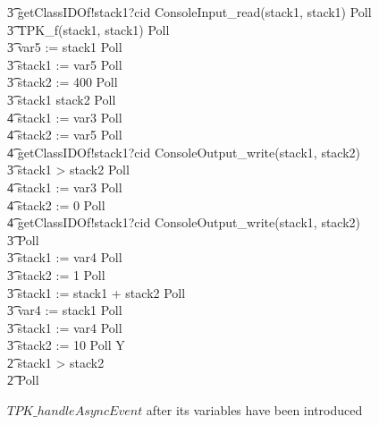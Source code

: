\begin{figure}[tp!]
\begin{circusaction}
    \t3 getClassIDOf!stack1?cid \then ConsoleInput\_read(stack1, stack1) \circseq Poll \circseq \\
    \t3 TPK\_f(stack1, stack1) \circseq Poll \circseq \\
    \t3 var5 := stack1 \circseq Poll \circseq \\
    \t3 stack1 := var5 \circseq Poll \circseq \\
    \t3 stack2 := 400 \circseq Poll \circseq \\
    \t3 \circif stack1 \leq stack2 \circthen Poll \circseq \\
    \t4 stack1 := var3 \circseq Poll \circseq \\
    \t4 stack2 := var5 \circseq Poll \circseq \\
    \t4 getClassIDOf!stack1?cid \then ConsoleOutput\_write(stack1, stack2) \\
    \t3 {} \circelse stack1 > stack2 \circthen Poll \circseq \\
    \t4 stack1 := var3 \circseq Poll \circseq \\
    \t4 stack2 := 0 \circseq Poll \circseq \\
    \t4 getClassIDOf!stack1?cid \then ConsoleOutput\_write(stack1, stack2) \\
    \t3 \circfi \circseq Poll \circseq \\
    \t3 stack1 := var4 \circseq Poll \circseq \\
    \t3 stack2 := 1 \circseq Poll \circseq \\
    \t3 stack1 := stack1 + stack2 \circseq Poll \circseq \\
    \t3 var4 := stack1 \circseq Poll \\
    \t3 stack1 := var4 \circseq Poll \circseq \\
    \t3 stack2 := 10 \circseq Poll \circseq \circseq Y \\
    \t2 {} \circelse stack1 > stack2 \circthen \Skip \\
    \t2 \circfi \circseq Poll
  \end{circusaction}
  \caption{$TPK\_handleAsyncEvent$ after its variables have been introduced}
  \label{efs-introduce-variables-example-figure}
\end{figure}